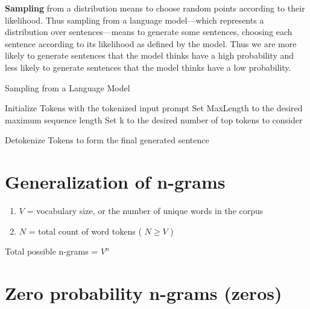 \textbf{Sampling} from a distribution means to choose random points according to their likelihood. Thus sampling from a language model—which represents a distribution over sentences—means to generate some sentences, choosing each sentence according to its likelihood as defined by the model. Thus we are more likely to generate sentences that the model thinks have a high probability and less likely to generate sentences that the model thinks have a low probability.

\begin{algorithm}
    \caption{Sampling from a Language Model}
    Initialize Tokens with the tokenized input prompt\;
    Set MaxLength to the desired maximum sequence length\;
    Set k to the desired number of top tokens to consider\;
    
    
    Detokenize Tokens to form the final generated sentence\;
\end{algorithm}


\section{Generalization of n-grams \cite{nlp-1}}
\begin{enumerate}
    \item $V$ = vocabulary size, or the number of unique words in the corpus
    \item $N$ = total count of word tokens ( $N \geq V$ )
\end{enumerate}

Total possible n-grams = $V^n$

\section{Zero probability n-grams (zeros) \cite{nlp-1}}

